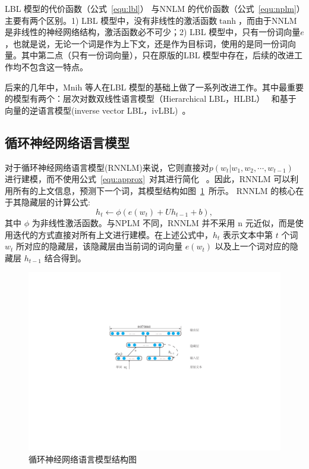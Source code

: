 LBL 模型的代价函数（公式~\ref{equ:lbl}） 与NNLM 的代价函数（公式~\ref{equ:nplm}）主要有两个区别。1) LBL 模型中，没有非线性的激活函数$\tanh$，而由于NNLM 是非线性的神经网络结构，激活函数必不可少；2) LBL 模型中，只有一份词向量$e$，也就是说，无论一个词是作为上下文，还是作为目标词，使用的是同一份词向量。其中第二点（只有一份词向量），只在原版的LBL 模型中存在，后续的改进工作均不包含这一特点。

后来的几年中，Mnih 等人在LBL 模型的基础上做了一系列改进工作。其中最重要的模型有两个：层次对数双线性语言模型（Hierarchical LBL，HLBL）~ 和基于向量的逆语言模型(inverse vector LBL，ivLBL)~。

\subsection{循环神经网络语言模型}
对于循环神经网络语言模型(RNNLM)来说，它则直接对$p(w_t | w_1,w_2,\cdots,w_{t-1}) $ 进行建模，而不使用公式~\ref{equ:approx}~对其进行简化~ 。因此，RNNLM 可以利用所有的上文信息，预测下一个词，其模型结构如图~\ref{fig:rnnlm}~所示。
RNNLM 的核心在于其隐藏层的计算公式:
\begin{equation}
\label{equ:rnn}
  h_t \leftarrow  \phi(e(w_t) + U h_{t-1} +b),
\end{equation}
其中 $\phi$ 为非线性激活函数。与NPLM 不同，RNNLM 并不采用 n 元近似，而是使用迭代的方式直接对所有上文进行建模。在上述公式中，$h_t$ 表示文本中第 $t$ 个词 $w_t$ 所对应的隐藏层，该隐藏层由当前词的词向量 $e(w_t)$ 以及上一个词对应的隐藏层 $h_{t -1}$ 结合得到。

\begin{figure}
  \centering
  \includegraphics[width=0.68\linewidth]{./figures/rnnlm.pdf}
  \caption{循环神经网络语言模型结构图}\label{fig:rnnlm}
\end{figure}

